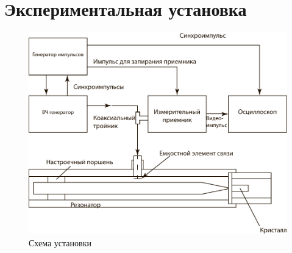 \documentclass[a4paper, 12pt]{article}
\begin{document}
	\section{Экспериментальная установка}
	\begin{figure}[!htb]
		\centering
		\includegraphics[scale=0.7]{PDF/scheme.pdf}
		\caption{Схема установки}
	\end{figure}
\end{document}
